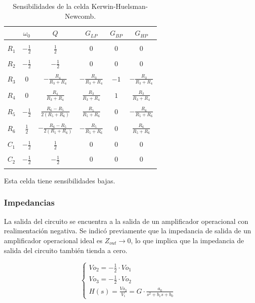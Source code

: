 \begin{table}[H]
	\centering
	\begin{tabular}{c c c c c c}
		& $\omega_0$ & $Q$ &$G_{LP}$ & $G_{BP}$& $G_{HP}$\\
		\hline \\
		$R_1$ & $-\frac{1}{2}$& $\frac{1}{2}$ & $0$& $0$&$0$\\ \\
		$R_2$ & $-\frac{1}{2}$& $-\frac{1}{2}$ & $0$& $0$& $0$\\ \\
		$R_3$ & $0$& $-\frac{R_4}{R_3+R_4}$ & $-\frac{R_3}{R_3+R_4}$&$-1$ & $-\frac{R_3}{R_3+R_4}$\\ \\
		$R_4$ & $0$& $\frac{R_4}{R_3+R_4}$& $\frac{R_3}{R_3+R_4}$ &$1$ & $\frac{R_3}{R_3+R_4}$\\ \\
		$R_5$ & $-\frac{1}{2}$&$\frac{R_6-R_5}{2(R_5+R_6)}$ & $\frac{R_5}{R_5+R_6}$&$0$ & $-\frac{R_6}{R_5+R_6}$\\ \\
		$R_6$ & $\frac{1}{2}$& $-\frac{R_6-R_5}{2(R_5+R_6)}$ & $-\frac{R_5}{R_5+R_6}$& $0$&$\frac{R_6}{R_5+R_6}$ \\ \\
		$C_1$ & $-\frac{1}{2}$& $\frac{1}{2}$ & $0$& $0$&$0$ \\ \\
		$C_2$ & $-\frac{1}{2}$& $-\frac{1}{2}$ & $0$ & $0$&$0$\\ \\
		\hline
	\end{tabular}
	\caption{Sensibilidades de la celda Kerwin-Huelsman-Newcomb.}
	\label{sens_k}
\end{table}


Esta celda tiene sensibilidades bajas.


\subsubsection{Impedancias}
La salida del circuito se encuentra a la salida de un amplificador operacional con realimentaci\'on negativa.  Se indic\'o previamente que la impedancia de salida de un amplificador operacional ideal es $Z_{out} \to 0$, lo que implica que la impedancia de salida del circuito tambi\'en tienda a cero.

\begin{equation}
\begin{cases}
Vo_2 = -\frac{1}{2} \cdot Vo_1\\
Vo_3 = -\frac{1}{2} \cdot Vo_2\\
H(s) = \frac{Vo_3}{V_i} = G \cdot \frac{a_0}{s^2 + b_1 s + b_0}
\label{int2eq}
\end{cases}
\end{equation}

